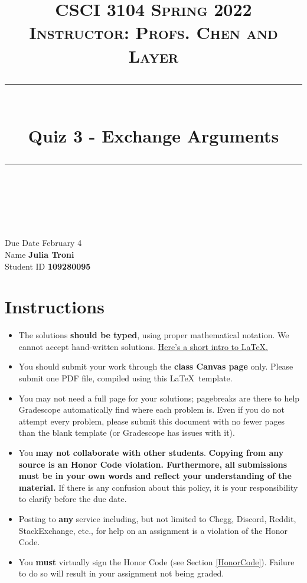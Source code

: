 \documentclass[11pt]{article}
\title{
\normalfont \normalsize 
\textsc{CSCI 3104 Spring 2022 \\ 
Instructor: Profs. Chen and Layer} \\
[10pt] 
\rule{\linewidth}{0.5pt} \\[6pt] 
\huge Quiz 3 - Exchange Arguments \\
\rule{\linewidth}{2pt}  \\[10pt]
}
\date{}
\theoremstyle{definition}
\theoremstyle{definition}
\theoremstyle{definition}
\begin{document}
\maketitle


\noindent
Due Date \dotfill February 4 \\
Name \dotfill \textbf{Julia Troni} \\
Student ID \dotfill \textbf{109280095} \\


\tableofcontents

\section{Instructions}
 \begin{itemize}
	\item The solutions \textbf{should be typed}, using proper mathematical notation. We cannot accept hand-written solutions. \href{http://ece.uprm.edu/~caceros/latex/introduction.pdf}{Here's a short intro to \LaTeX.}
	\item You should submit your work through the \textbf{class Canvas page} only. Please submit one PDF file, compiled using this \LaTeX \ template.
	\item You may not need a full page for your solutions; pagebreaks are there to help Gradescope automatically find where each problem is. Even if you do not attempt every problem, please submit this document with no fewer pages than the blank template (or Gradescope has issues with it).

	\item You \textbf{may not collaborate with other students}. \textbf{Copying from any source is an Honor Code violation. Furthermore, all submissions must be in your own words and reflect your understanding of the material.} If there is any confusion about this policy, it is your responsibility to clarify before the due date. 

	\item Posting to \textbf{any} service including, but not limited to Chegg, Discord, Reddit, StackExchange, etc., for help on an assignment is a violation of the Honor Code.

	\item You \textbf{must} virtually sign the Honor Code (see Section \ref{HonorCode}). Failure to do so will result in your assignment not being graded.
\end{itemize}
\end{document}
